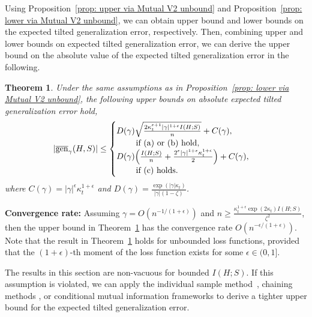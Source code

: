 \documentclass{article}
\theoremstyle{plain}
\theoremstyle{plain}
\newtheorem{theorem}{Theorem}[section]
\theoremstyle{definition}
\theoremstyle{remark}
\newtheorem{remark}[theorem]{Remark}
\begin{document}
Using Proposition~\ref{prop: upper via Mutual V2 unbound} and Proposition~\ref{prop: lower via Mutual V2 unbound}, we can obtain upper bound and lower bounds on the expected tilted generalization error, respectively. Then, combining upper and lower bounds on expected tilted generalization error, we can derive the upper bound on the absolute value of the expected tilted generalization error in the following.
\begin{theorem}\label{thm:|gen|_bound_unbounded_case}
Under the same assumptions as in Proposition~\ref{prop: lower via Mutual V2 unbound},
    the following upper bounds on absolute expected tilted generalization error hold,
\begin{equation*}
    \begin{split}
         |\overline{\mathrm{gen}}_{\gamma}(H,S)|\leq  \begin{cases}
           D(\gamma) \sqrt{\frac{2\kappa_t^{\epsilon+1} |\gamma|^{1+\epsilon} I(H;S)}{n}}+C(\gamma), \\\quad\quad\mbox{ \text{if (a) or (b) hold,}}\\
              D(\gamma)\Big( \frac{ I(H;S)}{n}+\frac{2^{\epsilon}|\gamma|^{1+\epsilon} \kappa_t^{1+\epsilon}}{2}\Big)+C(\gamma), \\\quad\quad\mbox{ \text{if (c) holds}}.
          \end{cases}
    \end{split}
\end{equation*}
where $C(\gamma)=|\gamma|^\epsilon\kappa_t^{1+\epsilon}$ and $D(\gamma)=\frac{\exp(|\gamma| \kappa_t)}{|\gamma|(1-\zeta)}$.
\end{theorem}
\textbf{Convergence rate:} Assuming $\gamma=O(n^{-1/(1+\epsilon)})$ and $n\geq \frac{\kappa_t^{1+\epsilon}\exp(2\kappa_t)I(H;S)}{\zeta^2}$, then the upper bound in Theorem~\ref{thm:|gen|_bound_unbounded_case} has the convergence rate $O(n^{-\epsilon/(1+\epsilon)})$. Note that the result in Theorem~\ref{thm:|gen|_bound_unbounded_case} holds for unbounded loss functions, provided that the $(1+\epsilon)$-th moment of the loss function exists for some $\epsilon\in(0,1]$.

The results in this section are non-vacuous for bounded $I(H;S)$. If this assumption is violated, we can apply the individual sample method~\citep{bu2020tightening}, chaining methods \citep{asadi2018chaining}, or conditional mutual information frameworks \citep{steinke2020reasoning} to derive a tighter upper bound for the expected tilted generalization error.
\end{document}
